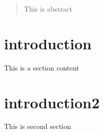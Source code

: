 \documentclass[12pt]{article}
\begin{document}
\maketitle

\begin{abstract}
This is abstract
\end{abstract}

\section{introduction}
This is a section content %

\section{introduction2} %
This is second section %
\end{document}
